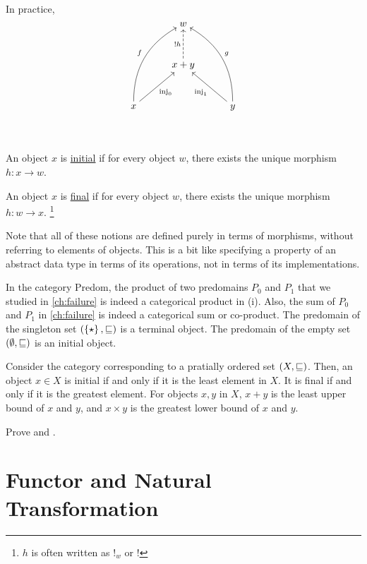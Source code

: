 \begin{enumcirc}
\begin{enumrm}
		In practice,
		\[
			\begin{tikzcd}[cramped, sep=3em]
				&
				w
				&
				\\
				&
				x + y \arrow[u, dashed, "!h"]
				&
				\\
				x \arrow[ur, swap, "\inj_0"] \arrow[uur, "f", bend left = 30]&
				&
				y \arrow[ul, "\inj_1"] \arrow[uul, swap, "g", bend right = 30]\\
			\end{tikzcd}
		\]
		\item
		An object $x$ is \ul{initial} if for every object $w$, there exists the unique
		morphism $h: x \to w$.
		\item
		An object $x$ is \ul{final} if for every object $w$, there exists the unique
		morphism $h: w \to x$.
		\footnote{$h$ is often written as $!_w$ or $!$}
	\end{enumrm}
	\item
	Note that all of these notions are defined purely in terms of morphisms,
	without referring to elements of objects.
	This is a bit like specifying a property of an abstract data type in terms of
	its operations, not in terms of its implementations.
	\item
	In the category Predom, the product of two predomains $P_0$ and $P_1$ that we
	studied in \cref{ch:failure} is indeed a categorical product in (i).
	Also, the sum of $P_0$ and $P_1$ in \cref{ch:failure} is indeed a categorical
	sum or co-product.
	The predomain of the singleton set $\left( \left\{ \star \right\}, \sqsubseteq \right)$ is a
	terminal object.
	The predomain of the empty set $\left( \emptyset, \sqsubseteq \right)$ is an initial
	object.
	\item
	Consider the category corresponding to a pratially ordered set $\left( X,
			\sqsubseteq \right)$.
	Then, an object $x \in X$ is initial if and only if it is the least element in
	$X$.
	It is final if and only if it is the greatest element.
	For objects $x, y$ in $X$, $x + y$ is the least upper bound of $x$ and $y$, and
	$x \times y$ is the greatest lower bound of $x$ and $y$.
\end{enumcirc}

\begin{exercise}
	Prove  and .
\end{exercise}

\section{Functor and Natural Transformation}

